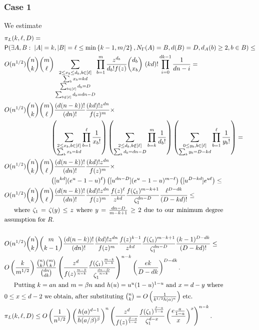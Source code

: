 \documentclass[11pt]{article}
\def\b{\beta}
\def\G{\Gamma}
\def\z{\zeta}
\def\p{\pi}
\newcommand{\set}[1]{\left\{#1\right\}}
\def\Pr{{\sf P}}
\newcommand{\brac}[1]{\left(#1\right)}
\newcommand{\bfrac}[2]{\brac{\frac{#1}{#2}}}
\begin{document}
\subsubsection{Case 1}\label{Case1}
We estimate
\begin{align}
&\p_L(k,\ell,D)=\nonumber\\
&\Pr(\exists A,B:\;|A|=k,|B|=\ell\leq \min\set{k-1,m/2},N_\G(A)=B,d(B)=D, d_A(b)\geq 2,b\in B)\leq\nonumber\\
&O(n^{1/2})\binom{n}{k}\binom{m}{\ell}\sum_{\substack{2\leq x_b\leq 
d_b,b\in[\ell]\\\sum_bx_b=kd\\\sum_{b\in [\ell]}d_b=D\\ \sum_{b\notin [\ell]}d_b=dn-D}}\prod_{b=1}^{m}\frac{z^{d_b}}{d_b!f(z)}
\binom{d_b}{x_b}\ (kd)!\prod_{i=0}^{dk-1}\frac{1}{dn-i}=\label{expl0}\\
&O(n^{1/2})\binom{n}{k}\binom{m}{\ell}\frac{(d(n-k))!}{(dn)!}\frac{(kd)!z^{dn}}{f(z)^{m}}\times\nonumber\\
&\hskip1in\brac{\sum_{\substack{2\leq x_b,b\in[{\ell}]\\\sum_bx_b=kd}}\prod_{b=1}^{\ell}\frac{1}{x_b!}}
\brac{\sum_{\substack{2\leq d_b,b\notin[{\ell}]\\\sum_bd_b=dn-D}}\prod_{b=k}^{m}\frac{1}{d_b!}}
\brac{\sum_{\substack{0\leq y_b,b\in[{\ell}]\\\sum_by_b=D-kd}}\prod_{b=1}^{\ell}\frac{1}{y_b!}}=\nonumber\\
&O(n^{1/2})\binom{n}{k}\binom{m}{\ell}\frac{(d(n-k))!}{(dn)!}\frac{(kd)!z^{dn}}{f(z)^{m}}\times\nonumber\\
&\hskip1in\brac{[u^{kd}](e^u-1-u)^{\ell}}\brac{[u^{dn-D}](e^u-1-u)^{m-\ell}}\brac{[u^{D-kd}]e^{u\ell}}\leq\label{3u}\\
&O(n^{1/2})\binom{n}{k}\binom{m}{\ell}\frac{(d(n-k))!}{(dn)!}\frac{(kd)!z^{dn}}{f(z)^{m}}
\frac{f(z)^{\ell}}{z^{kd}}\frac{f(\z_1)^{m-k+1}}{\z_1^{dn-D}}\frac{\ell^{D-dk}}{(D-kd)!}\leq\nonumber\\
\noalign{where $\z_1=\z(y)\leq z$ where $y=\frac{dn-D}{m-k+1}\geq 2$ due to our minimum degree assumption for $R$.} \nonumber\\
&O(n^{1/2})\binom{n}{k}\binom{m}{k-1}\frac{(d(n-k))!}{(dn)!}\frac{(kd)!z^{dn}}{f(z)^{m}}
\frac{f(z)^{k-1}}{z^{kd}}\frac{f(\z_1)^{m-k+1}}{\z_1^{dn-D}}\frac{(k-1)^{D-dk}}{(D-kd)!}\leq\label{4u}\\
&O\bfrac{k}{m^{1/2}}\frac{\binom{n}{k}\binom{m}{k}}{\binom{dn}{dk}}\brac{\frac{z^d}{f(z)^{\frac{m-k}{n-k}}}
\frac{f(\z_1)^{\frac{m-k}{n-k}}}{\z_1^{\frac{dn-D}{n-k}}}}^{n-k}\bfrac{ek}{D-dk}^{D-dk}.\nonumber\\
\noalign{Putting $k=an$ and $m=\b n$  and $h(u)=u^u(1-u)^{1-u}$ and $x=d-y$ where $0\le x \le d-2$ we obtain,
after substituting $\binom{n}{k}=O\bfrac{1}{k^{1/2}h(a)^n}$ etc. }
&\p_L(k,\ell,D)\leq O\bfrac{1}{n^{1/2}}\bfrac{h(a)^{d-1}}{h(a/\b)^{\b}}^n
\brac{\frac{z^d}{f(z)^{\frac{\b-a}{1-a}}}\frac{f(\z_1)^{\frac{\b-a}{1-a}}}{\z_1^{d-x}}
\bfrac{e\frac{a}{1-a}}{x}^x}^{n-k}.\label{1aa}
\end{align}
\end{document}
